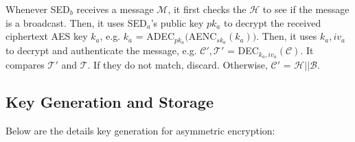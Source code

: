 \documentclass[11pt,oneside,onecolumn,letterpaper]{article}
\begin{document}
Whenever SED$_b$ receives a message $\mathcal{M}$, it first checks the $\mathcal{H}$ to see if the message is a broadcast.
Then, it uses SED$_a$'s public key $pk_a$ to decrypt the received ciphertext AES key $k_a$, e.g. $k_a$ = ADEC$_{pk_a}($AENC$_{sk_a}(k_a))$.
Then, it uses $k_a, iv_a$ to decrypt and authenticate the message, e.g. $\mathcal{C'}, \mathcal{T'}$ = DEC$_{k_a, iv_a}(\mathcal{C})$.
It compares $\mathcal{T'}$ and $\mathcal{T}$.
If they do not match, discard.
Otherwise, $\mathcal{C'}$ = $\mathcal{H}||\mathcal{B}$.

\subsection{Key Generation and Storage}

Below are the details key generation for asymmetric encryption:
\end{document}
